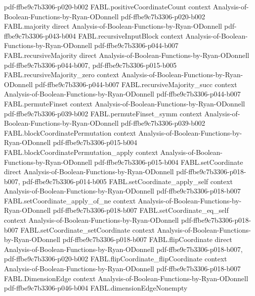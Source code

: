 \begin{theorem}
  {pdf-ffbe9c7b3306-p020-b002}
\proofstep
  {FABL.positiveCoordinateCount}
  {context}
  {Analysis-of-Boolean-Functions-by-Ryan-ODonnell}
  {pdf-ffbe9c7b3306-p020-b002}
\proofstep
  {FABL.majority}
  {direct}
  {Analysis-of-Boolean-Functions-by-Ryan-ODonnell}
  {pdf-ffbe9c7b3306-p043-b004}
\proofstep
  {FABL.recursiveInputBlock}
  {context}
  {Analysis-of-Boolean-Functions-by-Ryan-ODonnell}
  {pdf-ffbe9c7b3306-p044-b007}
\proofstep
  {FABL.recursiveMajority}
  {direct}
  {Analysis-of-Boolean-Functions-by-Ryan-ODonnell}
  {pdf-ffbe9c7b3306-p044-b007,
    pdf-ffbe9c7b3306-p015-b005}
\proofstep
  {FABL.recursiveMajority_zero}
  {context}
  {Analysis-of-Boolean-Functions-by-Ryan-ODonnell}
  {pdf-ffbe9c7b3306-p044-b007}
\proofstep
  {FABL.recursiveMajority_succ}
  {context}
  {Analysis-of-Boolean-Functions-by-Ryan-ODonnell}
  {pdf-ffbe9c7b3306-p044-b007}
\proofstep
  {FABL.permuteFinset}
  {context}
  {Analysis-of-Boolean-Functions-by-Ryan-ODonnell}
  {pdf-ffbe9c7b3306-p039-b002}
\proofstep
  {FABL.permuteFinset_symm}
  {context}
  {Analysis-of-Boolean-Functions-by-Ryan-ODonnell}
  {pdf-ffbe9c7b3306-p039-b002}
\proofstep
  {FABL.blockCoordinatePermutation}
  {context}
  {Analysis-of-Boolean-Functions-by-Ryan-ODonnell}
  {pdf-ffbe9c7b3306-p015-b004}
\proofstep
  {FABL.blockCoordinatePermutation_apply}
  {context}
  {Analysis-of-Boolean-Functions-by-Ryan-ODonnell}
  {pdf-ffbe9c7b3306-p015-b004}
\proofstep
  {FABL.setCoordinate}
  {direct}
  {Analysis-of-Boolean-Functions-by-Ryan-ODonnell}
  {pdf-ffbe9c7b3306-p018-b007,
    pdf-ffbe9c7b3306-p014-b005}
\proofstep
  {FABL.setCoordinate_apply_self}
  {context}
  {Analysis-of-Boolean-Functions-by-Ryan-ODonnell}
  {pdf-ffbe9c7b3306-p018-b007}
\proofstep
  {FABL.setCoordinate_apply_of_ne}
  {context}
  {Analysis-of-Boolean-Functions-by-Ryan-ODonnell}
  {pdf-ffbe9c7b3306-p018-b007}
\proofstep
  {FABL.setCoordinate_eq_self}
  {context}
  {Analysis-of-Boolean-Functions-by-Ryan-ODonnell}
  {pdf-ffbe9c7b3306-p018-b007}
\proofstep
  {FABL.setCoordinate_setCoordinate}
  {context}
  {Analysis-of-Boolean-Functions-by-Ryan-ODonnell}
  {pdf-ffbe9c7b3306-p018-b007}
\proofstep
  {FABL.flipCoordinate}
  {direct}
  {Analysis-of-Boolean-Functions-by-Ryan-ODonnell}
  {pdf-ffbe9c7b3306-p018-b007,
    pdf-ffbe9c7b3306-p020-b002}
\proofstep
  {FABL.flipCoordinate_flipCoordinate}
  {context}
  {Analysis-of-Boolean-Functions-by-Ryan-ODonnell}
  {pdf-ffbe9c7b3306-p018-b007}
\proofstep
  {FABL.DimensionEdge}
  {context}
  {Analysis-of-Boolean-Functions-by-Ryan-ODonnell}
  {pdf-ffbe9c7b3306-p046-b004}
\proofstep
  {FABL.dimensionEdgeNonempty}

\end{theorem}
